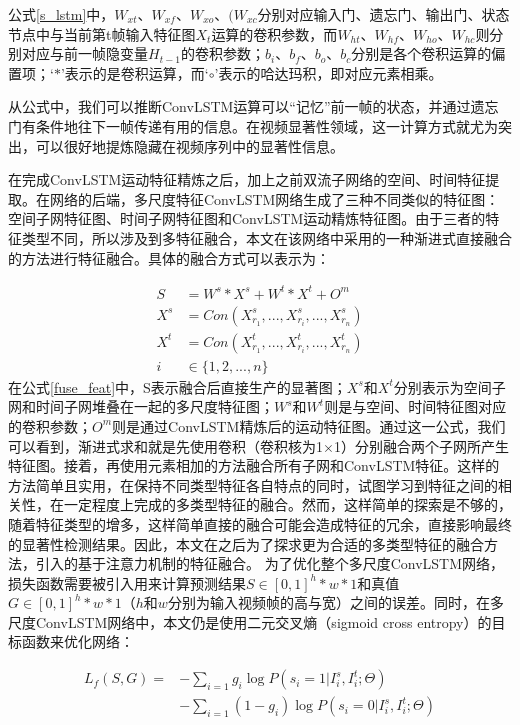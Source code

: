 公式\ref{s_lstm}中，$W_{xt}$、$W_{xf}$、$W_{xo}$、$(W_{xc}$分别对应输入门、遗忘门、输出门、状态节点中与当前第t帧输入特征图$X_t$运算的卷积参数，而$W_{ht}$、$W_{hf}$、$W_{ho}$、$W_{hc}$则分别对应与前一帧隐变量$H_{t-1}$的卷积参数；$b_i$、$ b_f$、$ b_o$、$ b_c$分别是各个卷积运算的偏置项；`$*$'表示的是卷积运算，而`$\circ$'表示的哈达玛积，即对应元素相乘。

从公式中，我们可以推断ConvLSTM运算可以“记忆”前一帧的状态，并通过遗忘门有条件地往下一帧传递有用的信息。在视频显著性领域，这一计算方式就尤为突出，可以很好地提炼隐藏在视频序列中的显著性信息。

在完成ConvLSTM运动特征精炼之后，加上之前双流子网络的空间、时间特征提取。在网络的后端，多尺度特征ConvLSTM网络生成了三种不同类似的特征图：空间子网特征图、时间子网特征图和ConvLSTM运动精炼特征图。由于三者的特征类型不同，所以涉及到多特征融合，本文在该网络中采用的一种渐进式直接融合的方法进行特征融合。具体的融合方式可以表示为：

\begin{equation}
\label{fuse_feat}
\begin{aligned}
   S  &= W^s * X^s + W^t * X^t + O^m \\
   X^s &= Con(X^s_{r_1}, ...,X^s_{r_i}, ..., X^s_{r_n}) \\
   X^t &= Con(X^t_{r_1}, ...,X^t_{r_i}, ..., X^t_{r_n}) \\
   i &\in \{1,2,...,n\}
 \end{aligned}
\end{equation}
在公式\ref{fuse_feat}中，S表示融合后直接生产的显著图；$X^s$和$X^t$分别表示为空间子网和时间子网堆叠在一起的多尺度特征图；$W^s$和$W^t$则是与空间、时间特征图对应的卷积参数；$O^m$则是通过ConvLSTM精炼后的运动特征图。通过这一公式，我们可以看到，渐进式求和就是先使用卷积（卷积核为1$\times$1）分别融合两个子网所产生特征图。接着，再使用元素相加的方法融合所有子网和ConvLSTM特征。这样的方法简单且实用，在保持不同类型特征各自特点的同时，试图学习到特征之间的相关性，在一定程度上完成的多类型特征的融合。然而，这样简单的探索是不够的，随着特征类型的增多，这样简单直接的融合可能会造成特征的冗余，直接影响最终的显著性检测结果。因此，本文在之后为了探求更为合适的多类型特征的融合方法，引入的基于注意力机制的特征融合。
为了优化整个多尺度ConvLSTM网络，损失函数需要被引入用来计算预测结果$S\in [0,1]^h*w*1$和真值$G\in [0,1]^h*w*1$（$h$和$w$分别为输入视频帧的高与宽）之间的误差。同时，在多尺度ConvLSTM网络中，本文仍是使用二元交叉熵（sigmoid cross entropy）的目标函数来优化网络：

\begin{equation}
 \label{loss2}
 \begin{aligned}
   L_f(S, G) = &- \sum_{i=1} g_i \log P(s_i = 1|I^{s}_i, I^{t}_i; \Theta) \\
             &- \sum_{i=1} (1-g_i)\log P(s_i = 0|I^{s}_i, I^{t}_i; \Theta)
   \end{aligned}
\end{equation}

